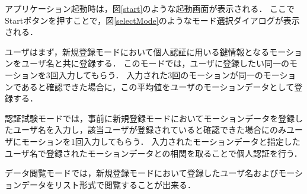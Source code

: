 \documentclass[11pt]{jreport}
\begin{document}
    アプリケーション起動時は，図\ref{start}のような起動画面が表示される．
    ここでStartボタンを押すことで，図\ref{selectMode}のようなモード選択ダイアログが表示される．

    ユーザはまず，新規登録モードにおいて個人認証に用いる鍵情報となるモーションをユーザ名と共に登録する．
    このモードでは，ユーザに登録したい同一のモーションを3回入力してもらう．
    入力された3回のモーションが同一のモーションであると確認できた場合に，この平均値をユーザのモーションデータとして登録する．

    認証試験モードでは，事前に新規登録モードにおいてモーションデータを登録したユーザ名を入力し，該当ユーザが登録されていると確認できた場合にのみユーザにモーションを1回入力してもらう．
    入力されたモーションデータと指定したユーザ名で登録されたモーションデータとの相関を取ることで個人認証を行う．

    データ閲覧モードでは，新規登録モードにおいて登録したユーザ名およびモーションデータをリスト形式で閲覧することが出来る．
\end{document}
